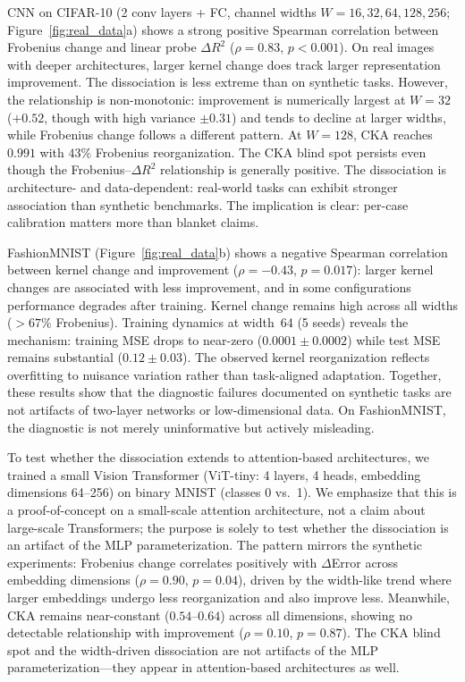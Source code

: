 \documentclass[twoside,11pt]{article}
\begin{document}
CNN on CIFAR-10 (2 conv layers + FC, channel widths $W=16,32,64,128,256$; Figure~\ref{fig:real_data}a) shows a strong positive Spearman correlation between Frobenius change and linear probe $\Delta R^2$ ($\rho=0.83$, $p<0.001$). On real images with deeper architectures, larger kernel change does track larger representation improvement. The dissociation is less extreme than on synthetic tasks. However, the relationship is non-monotonic: improvement is numerically largest at $W=32$ ($+0.52$, though with high variance $\pm0.31$) and tends to decline at larger widths, while Frobenius change follows a different pattern. At $W=128$, CKA reaches $0.991$ with $43\%$ Frobenius reorganization. The CKA blind spot persists even though the Frobenius--$\Delta R^2$ relationship is generally positive. The dissociation is architecture- and data-dependent: real-world tasks can exhibit stronger association than synthetic benchmarks. The implication is clear: per-case calibration matters more than blanket claims.

FashionMNIST (Figure~\ref{fig:real_data}b) shows a negative Spearman correlation between kernel change and improvement ($\rho=-0.43$, $p=0.017$): larger kernel changes are associated with less improvement, and in some configurations performance degrades after training.  Kernel change remains high across all widths ($>67\%$ Frobenius).  Training dynamics at width~64 (5 seeds) reveals the mechanism: training MSE drops to near-zero ($0.0001\pm0.0002$) while test MSE remains substantial ($0.12\pm0.03$). The observed kernel reorganization reflects overfitting to nuisance variation rather than task-aligned adaptation.  Together, these results show that the diagnostic failures documented on synthetic tasks are not artifacts of two-layer networks or low-dimensional data. On FashionMNIST, the diagnostic is not merely uninformative but actively misleading.

To test whether the dissociation extends to attention-based architectures, we trained a small Vision Transformer (ViT-tiny: 4 layers, 4 heads, embedding dimensions 64--256) on binary MNIST (classes 0 vs.\ 1). We emphasize that this is a proof-of-concept on a small-scale attention architecture, not a claim about large-scale Transformers; the purpose is solely to test whether the dissociation is an artifact of the MLP parameterization. The pattern mirrors the synthetic experiments: Frobenius change correlates positively with $\Delta$Error across embedding dimensions ($\rho=0.90$, $p=0.04$), driven by the width-like trend where larger embeddings undergo less reorganization and also improve less. Meanwhile, CKA remains near-constant ($0.54$--$0.64$) across all dimensions, showing no detectable relationship with improvement ($\rho=0.10$, $p=0.87$). The CKA blind spot and the width-driven dissociation are not artifacts of the MLP parameterization---they appear in attention-based architectures as well.
\end{document}
